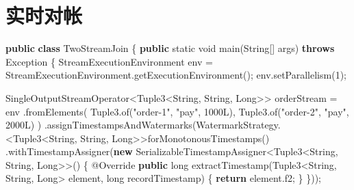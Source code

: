 \documentclass[cn,11pt,chinese]{elegantbook}
\newenvironment{Shaded}{}{}
\newcommand{\AttributeTok}[1]{\textcolor[rgb]{0.49,0.56,0.16}{#1}}
\newcommand{\BuiltInTok}[1]{#1}
\newcommand{\DataTypeTok}[1]{\textcolor[rgb]{0.56,0.13,0.00}{#1}}
\newcommand{\DecValTok}[1]{\textcolor[rgb]{0.25,0.63,0.44}{#1}}
\newcommand{\FunctionTok}[1]{\textcolor[rgb]{0.02,0.16,0.49}{#1}}
\newcommand{\KeywordTok}[1]{\textcolor[rgb]{0.00,0.44,0.13}{\textbf{#1}}}
\newcommand{\NormalTok}[1]{#1}
\newcommand{\StringTok}[1]{\textcolor[rgb]{0.25,0.44,0.63}{#1}}
\begin{document}
\hypertarget{ux5b9eux65f6ux5bf9ux5e10}{%
\section{实时对帐}\label{ux5b9eux65f6ux5bf9ux5e10}}

\begin{Shaded}
\begin{Highlighting}[]
\KeywordTok{public} \KeywordTok{class}\NormalTok{ TwoStreamJoin \{}
    \KeywordTok{public} \DataTypeTok{static} \DataTypeTok{void} \FunctionTok{main}\NormalTok{(}\BuiltInTok{String}\NormalTok{[] args) }\KeywordTok{throws} \BuiltInTok{Exception}\NormalTok{ \{}
\NormalTok{        StreamExecutionEnvironment env = StreamExecutionEnvironment.}\FunctionTok{getExecutionEnvironment}\NormalTok{();}
\NormalTok{        env.}\FunctionTok{setParallelism}\NormalTok{(}\DecValTok{1}\NormalTok{);}

\NormalTok{        SingleOutputStreamOperator\textless{}Tuple3\textless{}}\BuiltInTok{String}\NormalTok{, }\BuiltInTok{String}\NormalTok{, }\BuiltInTok{Long}\NormalTok{\textgreater{}\textgreater{} orderStream = env}
\NormalTok{                .}\FunctionTok{fromElements}\NormalTok{(}
\NormalTok{                        Tuple3.}\FunctionTok{of}\NormalTok{(}\StringTok{"order{-}1"}\NormalTok{, }\StringTok{"pay"}\NormalTok{, }\DecValTok{1000L}\NormalTok{),}
\NormalTok{                        Tuple3.}\FunctionTok{of}\NormalTok{(}\StringTok{"order{-}2"}\NormalTok{, }\StringTok{"pay"}\NormalTok{, }\DecValTok{2000L}\NormalTok{)}
\NormalTok{                )}
\NormalTok{                .}\FunctionTok{assignTimestampsAndWatermarks}\NormalTok{(WatermarkStrategy.\textless{}Tuple3\textless{}}\BuiltInTok{String}\NormalTok{, }\BuiltInTok{String}\NormalTok{, }\BuiltInTok{Long}\NormalTok{\textgreater{}\textgreater{}}\FunctionTok{forMonotonousTimestamps}\NormalTok{()}
\NormalTok{                        .}\FunctionTok{withTimestampAssigner}\NormalTok{(}\KeywordTok{new}\NormalTok{ SerializableTimestampAssigner\textless{}Tuple3\textless{}}\BuiltInTok{String}\NormalTok{, }\BuiltInTok{String}\NormalTok{, }\BuiltInTok{Long}\NormalTok{\textgreater{}\textgreater{}() \{}
                            \AttributeTok{@Override}
                            \KeywordTok{public} \DataTypeTok{long} \FunctionTok{extractTimestamp}\NormalTok{(Tuple3\textless{}}\BuiltInTok{String}\NormalTok{, }\BuiltInTok{String}\NormalTok{, }\BuiltInTok{Long}\NormalTok{\textgreater{} element, }\DataTypeTok{long}\NormalTok{ recordTimestamp) \{}
                                \KeywordTok{return}\NormalTok{ element.}\FunctionTok{f2}\NormalTok{;}
\NormalTok{                            \}}
\NormalTok{                        \}));}


\end{Highlighting}
\end{Shaded}
\end{document}
